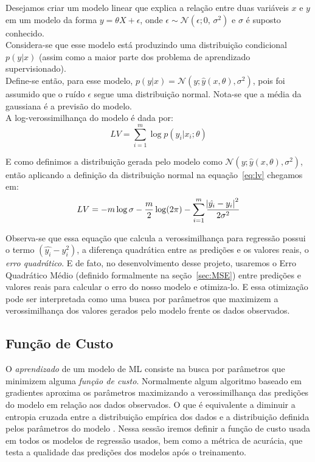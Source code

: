 Desejamos criar um modelo linear que explica a relação entre duas variáveis
$x$ e $y$ em um modelo da forma $y = \theta X + \epsilon$, onde $\epsilon
\sim \mathcal{N}(\epsilon;0,\,\sigma^2)$ e $\sigma$ é suposto conhecido.\\

Considera-se que esse modelo está produzindo uma distribuição condicional
$p(y|x)$ (assim como a maior parte dos problema de aprendizado supervisionado). \\ 

Define-se então, para esse modelo, $p(y|x) =
\mathcal{N}(y ; \hat{y}(x,\theta),\sigma^2)$, pois foi assumido que o ruído $\epsilon$
segue uma distribuição normal. Nota-se que a média da gaussiana é a previsão do
modelo. \\

A log-verossimilhança do modelo é dada por: \\

\begin{equation}
  \label{eq:lv}
LV =  \sum^m_{i=1}\log p(y_i | x_i ; \theta)
\end{equation}

E como definimos a distribuição gerada pelo modelo como $\mathcal{N}(y ;
\hat{y}(x,\theta),\sigma^2)$, então aplicando a definição da
distribuição normal na equação~\ref{eq:lv} chegamos em: \\

\[LV = -m \log \sigma - \frac{m}{2} \log (2 \pi) - \sum^m_{i=1}
  \frac{\abs{\hat{y_i}-y_i}^2}{2 \sigma^2} \]

Observa-se que essa equação que calcula a verossimilhança para regressão possui o termo $(\hat{y_i}-y_i^2)$, a diferença
quadrática entre as predições e os valores reais, o \textit{erro quadrático}. E
de fato, no desenvolvimento desse projeto, usaremos o Erro Quadrático Médio
(definido formalmente na seção~\ref{sec:MSE}) entre
predições e valores reais para calcular o erro do nosso modelo e otimiza-lo.  
E essa otimização pode ser interpretada como uma busca por parâmetros que
maximizem a verossimilhança dos valores gerados pelo modelo frente os dados
observados. \\ 

\subsection{Função de Custo}

O \textit{aprendizado} de um modelo de ML consiste na busca por parâmetros que
minimizem alguma \textit{função de custo}. Normalmente algum algoritmo baseado
em gradientes aproxima os parâmetros maximizando a verossimilhança das predições
do modelo em relação aos dados observados. O que é equivalente a diminuir a
entropia cruzada entre a distribuição empírica dos dados e a distribuição
definida pelos parâmetros do modelo \citep{dlbook}. Nessa sessão iremos definir
a função de custo usada em todos os modelos de regressão usados, bem como a
métrica de acurácia, que testa a qualidade das predições dos modelos após o treinamento. \\

